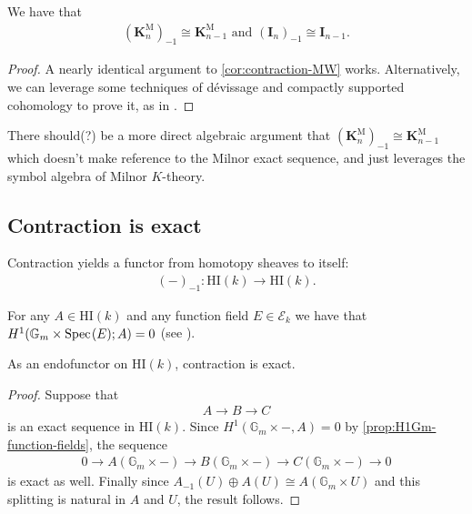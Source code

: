 \documentclass[11pt,openany]{book}
\providecommand{\HI}{\mathrm{HI}}
\providecommand{\KM}{\mathbf{K}^\mathrm{M}}
\begin{document}
\begin{corollary} We have that
\begin{align*}
    (\KM_n)_{-1} \cong \KM_{n-1} \text{ and } (\mathbf{I}_n)_{-1} \cong \mathbf{I}_{n-1}.
\end{align*}
\end{corollary}
\begin{proof} A nearly identical argument to \autoref{cor:contraction-MW} works. Alternatively, we can leverage some techniques of d\'evissage and compactly supported cohomology to prove it, as in \cite[2.9]{AF-spheres}.
\end{proof}

\begin{note} There should(?) be a more direct algebraic argument that $\left( \KM_n \right)_{-1} \cong \KM_{n-1}$ which doesn't make reference to the Milnor exact sequence, and just leverages the symbol algebra of Milnor $K$-theory.
\end{note}

\subsection{Contraction is exact}

Contraction yields a functor from homotopy sheaves to itself:
\begin{align*}
    (-)_{-1} \colon \HI(k) \to \HI(k).
\end{align*}
%
\begin{proposition}\label{prop:H1Gm-function-fields} 
For any $A \in \HI(k)$ and any function field $E \in \mathcal{E}_k$ we have that $H^1( \mathbb{G}_m \times \text{Spec}\hspace{0.1em}(E);A) = 0$  (see \cite[4.10]{Deglise-finite-corr}).
\end{proposition}

\begin{proposition} As an endofunctor on $\HI(k)$, contraction is exact.
\end{proposition}
\begin{proof} Suppose that
\begin{align*}
    A \to B \to C
\end{align*}
is an exact sequence in $\HI(k)$. Since $H^1(\mathbb{G}_m \times -, A) = 0$ by \autoref{prop:H1Gm-function-fields}, the sequence
\begin{align*}
    0 \to A(\mathbb{G}_m \times -) \to B(\mathbb{G}_m \times -) \to C(\mathbb{G}_m \times -) \to 0
\end{align*}
is exact as well. Finally since $A_{-1}(U) \oplus A(U) \cong A(\mathbb{G}_m \times U)$ and this splitting is natural in $A$ and $U$, the result follows.
\end{proof}
\end{document}
